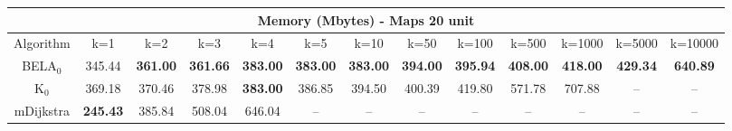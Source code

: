 \begin{tabular}{c|cccccccccccc}\toprule
\multicolumn{13}{c}{Memory (Mbytes) - Maps 20 unit}\\ \midrule
Algorithm & k=1 & k=2 & k=3 & k=4 & k=5 & k=10 & k=50 & k=100 & k=500 & k=1000 & k=5000 & k=10000 \\ \midrule
BELA$_0$ & 345.44 & \textbf{361.00} & \textbf{361.66} & \textbf{383.00} & \textbf{383.00} & \textbf{383.00} & \textbf{394.00} & \textbf{395.94} & \textbf{408.00} & \textbf{418.00} & \textbf{429.34} & \textbf{640.89} \\
K$_0$ & 369.18 & 370.46 & 378.98 & \textbf{383.00} & 386.85 & 394.50 & 400.39 & 419.80 & 571.78 & 707.88 & -- & -- \\
mDijkstra & \textbf{245.43} & 385.84 & 508.04 & 646.04 & -- & -- & -- & -- & -- & -- & -- & -- \\ \bottomrule 
\end{tabular}

